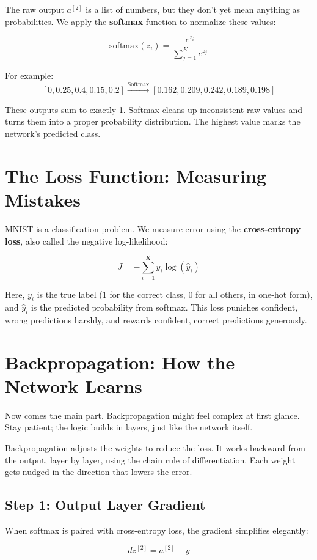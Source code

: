 \documentclass[11pt]{article}
\begin{document}
The raw output $a^{[2]}$ is a list of numbers, but they don't yet mean anything as probabilities. We apply the \textbf{softmax} function to normalize these values:

\[
\text{softmax}(z_i) = \frac{e^{z_i}}{\sum_{j=1}^{K} e^{z_j}}
\]

For example:
\[
[0, 0.25, 0.4, 0.15, 0.2] \xrightarrow{\text{Softmax}} [0.162, 0.209, 0.242, 0.189, 0.198]
\]

These outputs sum to exactly 1. Softmax cleans up inconsistent raw values and turns them into a proper probability distribution. The highest value marks the network's predicted class.

\section*{The Loss Function: Measuring Mistakes}

MNIST is a classification problem. We measure error using the \textbf{cross-entropy loss}, also called the negative log-likelihood:

\[
J = -\sum_{i=1}^{K} y_i \log(\hat{y}_i)
\]

Here, $y_i$ is the true label (1 for the correct class, 0 for all others, in one-hot form), and $\hat{y}_i$ is the predicted probability from softmax. This loss punishes confident, wrong predictions harshly, and rewards confident, correct predictions generously.

\section*{Backpropagation: How the Network Learns}

Now comes the main part. Backpropagation might feel complex at first glance. Stay patient; the logic builds in layers, just like the network itself.

Backpropagation adjusts the weights to reduce the loss. It works backward from the output, layer by layer, using the chain rule of differentiation. Each weight gets nudged in the direction that lowers the error.

\subsection*{Step 1: Output Layer Gradient}

When softmax is paired with cross-entropy loss, the gradient simplifies elegantly:

\[
dz^{[2]} = a^{[2]} - y
\]
\end{document}
